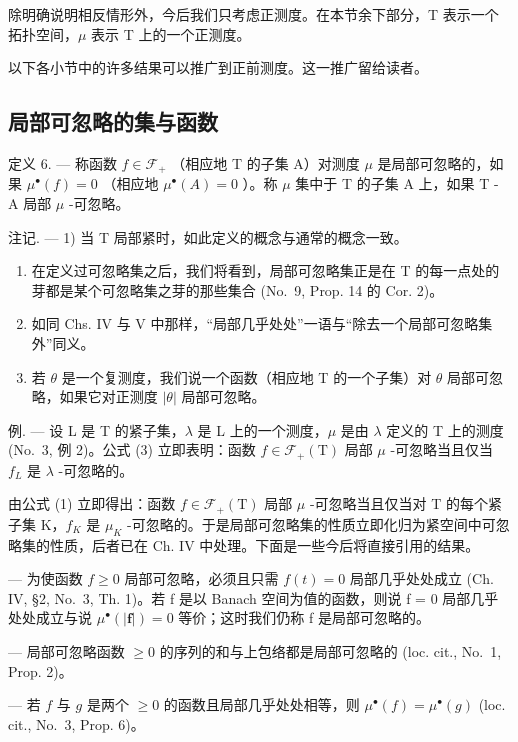 除明确说明相反情形外，今后我们只考虑正测度。在本节余下部分，T 表示一个拓扑空间，\(\mu\) 表示 T 上的一个正测度。

以下各小节中的许多结果可以推广到正前测度。这一推广留给读者。

\subsection{局部可忽略的集与函数}

定义 6. --- 称函数 \(f \in \mathcal{F}_{+}\) （相应地 T 的子集 A）对测度 \(\mu\) 是局部可忽略的，如果 \(\mu^{\bullet}(f) = 0\) （相应地 \(\mu^{\bullet}(A) = 0\) ）。称 \(\mu\) 集中于 T 的子集 A 上，如果 T - A 局部 \(\mu\) -可忽略。

注记. --- 1) 当 T 局部紧时，如此定义的概念与通常的概念一致。

\begin{enumerate}
\def\labelenumi{\arabic{enumi})}
\setcounter{enumi}{1}
\item
  在定义过可忽略集之后，我们将看到，局部可忽略集正是在 T 的每一点处的芽都是某个可忽略集之芽的那些集合 (No.~9, Prop. 14 的 Cor. 2)。
\item
  如同 Chs. IV 与 V 中那样，“局部几乎处处”一语与“除去一个局部可忽略集外”同义。
\item
  若 \(\theta\) 是一个复测度，我们说一个函数（相应地 T 的一个子集）对 \(\theta\) 局部可忽略，如果它对正测度 \(|\theta|\) 局部可忽略。
\end{enumerate}

例. --- 设 L 是 T 的紧子集，\(\lambda\) 是 L 上的一个测度，\(\mu\) 是由 \(\lambda\) 定义的 T 上的测度 (No.~3, 例 2)。公式 (3) 立即表明：函数 \(f \in \mathcal{F}_{+}(\mathrm{T})\) 局部 \(\mu\) -可忽略当且仅当 \(f_{L}\) 是 \(\lambda\) -可忽略的。

由公式 (1) 立即得出：函数 \(f \in \mathcal{F}_{+}(\mathrm{T})\) 局部 \(\mu\) -可忽略当且仅当对 T 的每个紧子集 K，\(f_{K}\) 是 \(\mu_{K}\) -可忽略的。于是局部可忽略集的性质立即化归为紧空间中可忽略集的性质，后者已在 Ch. IV 中处理。下面是一些今后将直接引用的结果。

--- 为使函数 \(f \geqslant 0\) 局部可忽略，必须且只需 \(f(t) = 0\) 局部几乎处处成立 (Ch. IV, §2, No.~3, Th. 1)。若 f 是以 Banach 空间为值的函数，则说 f = 0 局部几乎处处成立与说 \(\mu^{\bullet}(|\mathbf{f}|) = 0\) 等价；这时我们仍称 f 是局部可忽略的。

--- 局部可忽略函数 \(\geqslant0\) 的序列的和与上包络都是局部可忽略的 (loc. cit., No.~1, Prop. 2)。

--- 若 \(f\) 与 \(g\) 是两个 \(\geqslant 0\) 的函数且局部几乎处处相等，则 \(\mu^{\bullet}(f) = \mu^{\bullet}(g)\) (loc. cit., No.~3, Prop. 6)。

